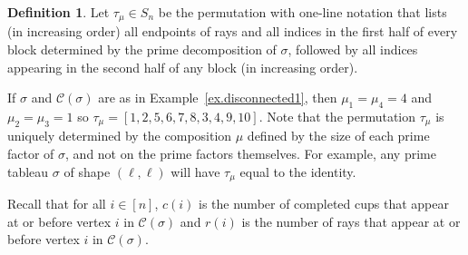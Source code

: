 \documentclass[11pt]{amsart}
\theoremstyle{remark}
\theoremstyle{remark}
\theoremstyle{definition}
\theoremstyle{definition}
\theoremstyle{definition}
\newtheorem{definition}[theorem]{Definition}
\numberwithin{equation}{section}
\newcommand{\gs}{\sigma}
\newcommand{\cc}{\mathcal{C}}
\newcommand{\cupsigma}{\cc(\gs)}
\begin{document}
\begin{definition}\label{def.tau_gs} Let $\tau_\mu\in S_n$ be the permutation with one-line notation that lists (in increasing order) all endpoints of rays and all indices in the first half of every block determined by the prime decomposition of $\gs$, followed by all indices appearing in the second half of any block (in increasing order). 
\end{definition}

 If $\gs$ and $\cupsigma$ are as in Example~\ref{ex.disconnected1}, then $\mu_1 = \mu_4= 4$ and $\mu_2 = \mu_3 = 1$ so $\tau_\mu = [1,2,5,6,7,8,3,4,9,10]$. 
Note that the permutation $\tau_\mu$ is uniquely determined by the composition $\mu$ defined by the size of each prime factor of $\gs$, and not on the prime factors themselves. For example, any prime tableau $\gs$ of shape $(\ell, \ell)$ will have $\tau_\mu$ equal to the identity. 


Recall that for all $i\in [n]$, $c(i)$ is the number of completed cups that appear at or before vertex $i$ in $\cupsigma$ and $r(i)$ is the number of rays that appear at or before vertex $i$ in $\cupsigma$. 
\end{document}
